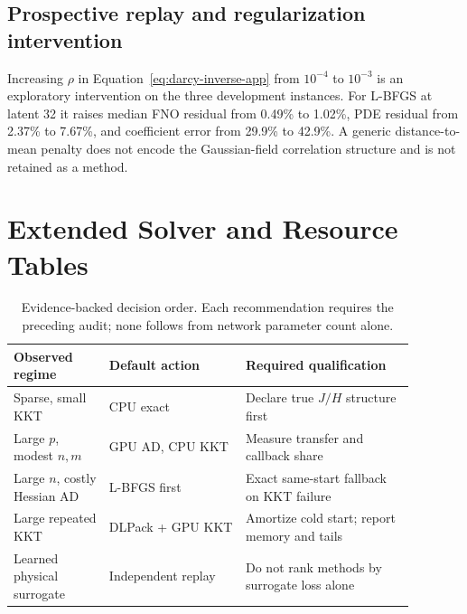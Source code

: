 \subsection{Prospective replay and regularization intervention}

\begin{table}[ht]
\centering
\caption{Prospective replay-Darcy medians over twelve disjoint instances and
five starts (60 attempts per row); all 360 solves pass common KKT.}
\label{tab:replay-prospective}
\small
\setlength{\tabcolsep}{3pt}

\end{table}

\begin{table}[ht]
\centering
\caption{Latent-32 paired effects with one median per physical instance.
Negative favors Gauss--Newton.  The bootstrap resamples twelve instances.}
\label{tab:replay-paired}
\small

\end{table}

Increasing $\rho$ in Equation~\ref{eq:darcy-inverse-app} from $10^{-4}$ to
$10^{-3}$ is an exploratory intervention on the three development instances.
For L-BFGS at latent 32 it
raises median FNO residual from 0.49\% to 1.02\%, PDE residual from 2.37\% to
7.67\%, and coefficient error from 29.9\% to 42.9\%.  A generic distance-to-
mean penalty does not encode the Gaussian-field correlation structure and is
not retained as a method.

\vfill
\section{Extended Solver and Resource Tables}
\label{app:extended}

\begin{table}[ht]
\centering
\caption{Evidence-backed decision order.  Each recommendation requires the
preceding audit; none follows from network parameter count alone.}
\label{tab:decisions}
\small
\setlength{\tabcolsep}{3.3pt}
\begin{tabular}{p{0.21\linewidth}p{0.30\linewidth}p{0.37\linewidth}}
\toprule
Observed regime & Default action & Required qualification\\
\midrule
Sparse, small KKT & CPU exact & Declare true $J/H$ structure first\\
Large $p$, modest $n,m$ & GPU AD, CPU KKT & Measure transfer and callback share\\
Large $n$, costly Hessian AD & L-BFGS first & Exact same-start fallback on KKT failure\\
Large repeated KKT & DLPack + GPU KKT & Amortize cold start; report memory and tails\\
Learned physical surrogate & Independent replay & Do not rank methods by surrogate loss alone\\
\bottomrule
\end{tabular}
\end{table}

